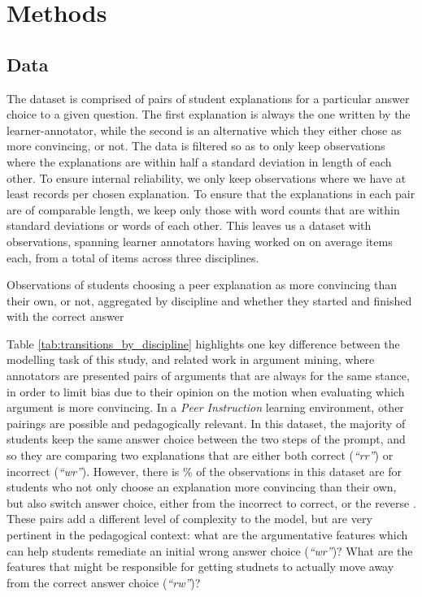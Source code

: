 \documentclass[runningheads]{llncs}
\begin{document}
\section{Methods}

\subsection{Data}
The dataset is comprised of pairs of student explanations for a particular 
answer choice to a given question. The first explanation is always the one 
written by the learner-annotator, while the second is an alternative which 
they either chose as more convincing, or not. The data is filtered so as 
to only keep observations where the explanations are within half a standard 
deviation in length of each other. To ensure internal reliability, we only keep 
observations where we have at least  
records per chosen explanation. To ensure that the explanations in each pair 
are of comparable length, we keep only those with word counts that are within 
 standard deviations or  
words 
of each other. This leaves us a dataset with 
 observations, spanning  learner 
annotators having worked on on average  items 
each, from a total of  items across three disciplines.
\begin{table}
\caption{Observations of students choosing a peer explanation as more 
	convincing than their own, or not, aggregated by discipline and whether 
	they 
	started and finished with the correct answer}



\label{tab:transitions_by_discipline}
\end{table}

Table \ref{tab:transitions_by_discipline} highlights one key difference between 
the modelling task of this study, and related work in argument mining, where 
annotators are presented pairs of arguments that are always for the same 
stance, in order to limit bias due to their opinion on the motion when 
evaluating which argument is more convincing.
In a \textit{Peer Instruction} learning environment, other pairings are 
possible and pedagogically relevant. In this dataset, the majority of students 
keep the same answer choice between the two steps of the prompt, and so they 
are comparing two explanations that are either both correct (\textit{``rr''}) 
or incorrect (\textit{``wr''}). However, there is 
\% 
of the observations in this dataset are for students who not only choose an 
explanation more convincing than their own, but also switch answer choice, 
either from the incorrect to correct, or the reverse . These pairs add a 
different level of complexity to the model, but are very pertinent in the 
pedagogical context: what are the argumentative features which can help 
students remediate an initial wrong answer choice (\textit{``wr''})? What are 
the features that might be responsible for getting studnets to actually move 
away from the correct answer choice (\textit{``rw''})?
\end{document}
